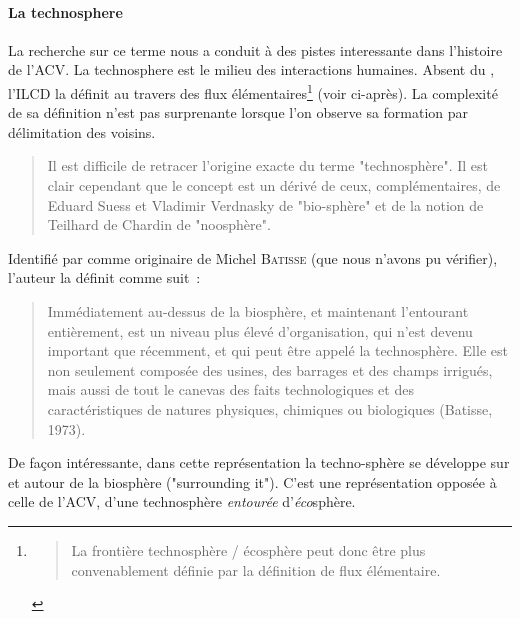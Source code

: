 \paragraph{La \gls{technosphere}} La recherche sur ce terme nous a conduit à des pistes interessante dans l'histoire de l'ACV. La \gls{technosphere} est le milieu des interactions humaines.
Absent du , l'\gls{ILCD} la définit au travers des flux élémentaires\footnote{\blockcquote[traduction]{european_commission_ilcd_2010}{
La frontière technosphère / écosphère peut donc être plus convenablement définie par la définition de flux élémentaire.
}} (voir ci-après).
La complexité de sa définition n'est pas surprenante lorsque l'on observe sa formation par délimitation des voisins.
\blockcquote[traduction]{bruni_cognitive_2011}{Il est difficile de retracer l'origine exacte du terme "technosphère".
Il est clair cependant que le concept est un dérivé de ceux, complémentaires, de Eduard Suess et Vladimir Verdnasky de "bio-sphère" et de la notion de Teilhard de Chardin de "noosphère".}

Identifié par \citeauthor{bruni_cognitive_2011,} comme originaire de Michel \textsc{Batisse} (que nous n'avons pu vérifier), l'auteur la définit comme suit~:
\blockcquote[traduction]{bruni_cognitive_2011}{
Immédiatement au-dessus de la biosphère, et maintenant l'entourant entièrement, est un niveau plus élevé d'organisation, qui n'est devenu important que récemment, et qui peut être appelé la technosphère.
Elle est non seulement composée des usines, des barrages et des champs irrigués, mais aussi de tout le canevas des faits technologiques et des caractéristiques de natures physiques, chimiques ou biologiques (Batisse, 1973).}
De façon intéressante, dans cette représentation la techno-sphère se développe sur et autour de la biosphère ("surrounding it").
C'est une représentation opposée à celle de l'ACV, d'une technosphère \emph{entourée} d'\emph{éco}sphère.

